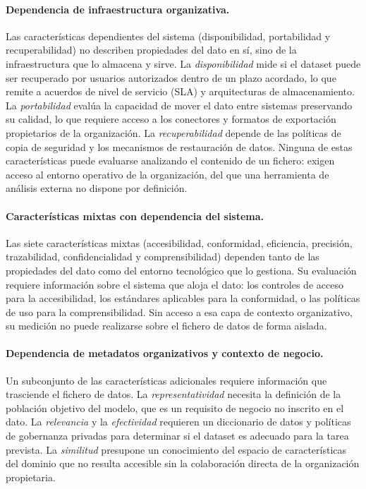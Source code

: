 \paragraph{Dependencia de infraestructura organizativa.}
Las características dependientes del sistema (disponibilidad, portabilidad
y recuperabilidad) no describen propiedades del dato en sí, sino de la
infraestructura que lo almacena y sirve. La \emph{disponibilidad} mide si el
dataset puede ser recuperado por usuarios autorizados dentro de un plazo
acordado, lo que remite a acuerdos de nivel de servicio (\ac{SLA}) y
arquitecturas de almacenamiento. La \emph{portabilidad} evalúa la capacidad
de mover el dato entre sistemas preservando su calidad, lo que requiere acceso
a los conectores y formatos de exportación propietarios de la organización.
La \emph{recuperabilidad} depende de las políticas de copia de seguridad y los
mecanismos de restauración de datos. Ninguna de estas características puede
evaluarse analizando el contenido de un fichero: exigen acceso al entorno
operativo de la organización, del que una herramienta de análisis externa
no dispone por definición.

\paragraph{Características mixtas con dependencia del sistema.}
Las siete características mixtas (accesibilidad, conformidad, eficiencia,
precisión, trazabilidad, confidencialidad y comprensibilidad) dependen tanto
de las propiedades del dato como del entorno tecnológico que lo gestiona.
Su evaluación requiere información sobre el sistema que aloja el dato: los
controles de acceso para la accesibilidad, los estándares aplicables para
la conformidad, o las políticas de uso para la comprensibilidad. Sin acceso
a esa capa de contexto organizativo, su medición no puede realizarse sobre
el fichero de datos de forma aislada.

\paragraph{Dependencia de metadatos organizativos y contexto de negocio.}
Un subconjunto de las características adicionales requiere información que
trasciende el fichero de datos. La \emph{representatividad} necesita la
definición de la población objetivo del modelo, que es un requisito de negocio
no inscrito en el dato. La \emph{relevancia} y la \emph{efectividad} requieren
un diccionario de datos y políticas de gobernanza privadas para determinar si
el dataset es adecuado para la tarea prevista. La \emph{similitud} presupone
un conocimiento del espacio de características del dominio que no resulta
accesible sin la colaboración directa de la organización propietaria.

